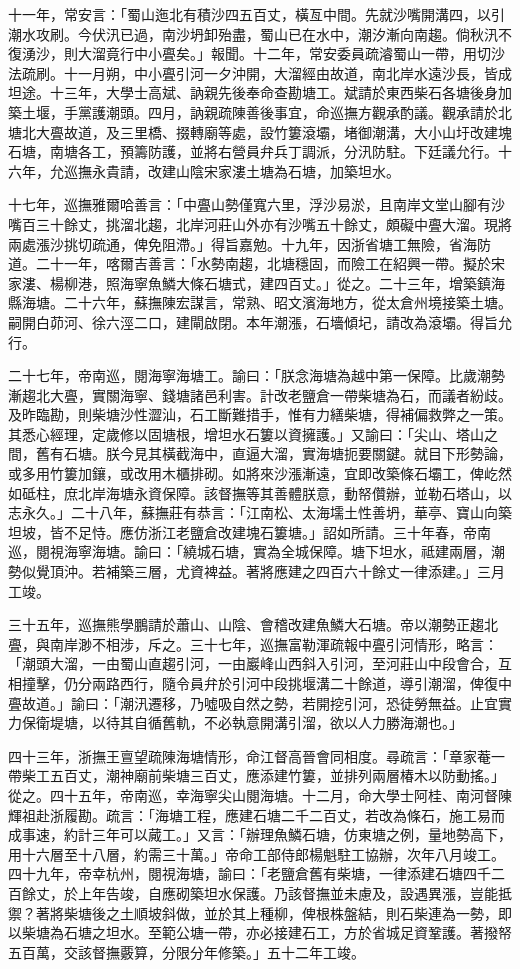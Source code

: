 \begin{pinyinscope}
十一年，常安言：「蜀山迤北有積沙四五百丈，橫亙中間。先就沙嘴開溝四，以引潮水攻刷。今伏汛已過，南沙坍卸殆盡，蜀山已在水中，潮汐漸向南趨。倘秋汛不復湧沙，則大溜竟行中小亹矣。」報聞。十二年，常安委員疏濬蜀山一帶，用切沙法疏刷。十一月朔，中小亹引河一夕沖開，大溜經由故道，南北岸水遠沙長，皆成坦途。十三年，大學士高斌、訥親先後奉命查勘塘工。斌請於東西柴石各塘後身加築土堰，手黨護潮頭。四月，訥親疏陳善後事宜，命巡撫方觀承酌議。觀承請於北塘北大亹故道，及三里橋、掇轉廟等處，設竹簍滾壩，堵御潮溝，大小山圩改建塊石塘，南塘各工，預籌防護，並將右營員弁兵丁調派，分汛防駐。下廷議允行。十六年，允巡撫永貴請，改建山陰宋家漊土塘為石塘，加築坦水。

十七年，巡撫雅爾哈善言：「中亹山勢僅寬六里，浮沙易淤，且南岸文堂山腳有沙嘴百三十餘丈，挑溜北趨，北岸河莊山外亦有沙嘴五十餘丈，頗礙中亹大溜。現將兩處漲沙挑切疏通，俾免阻滯。」得旨嘉勉。十九年，因浙省塘工無險，省海防道。二十一年，喀爾吉善言：「水勢南趨，北塘穩固，而險工在紹興一帶。擬於宋家漊、楊柳港，照海寧魚鱗大條石塘式，建四百丈。」從之。二十三年，增築鎮海縣海塘。二十六年，蘇撫陳宏謀言，常熟、昭文濱海地方，從太倉州境接築土塘。嗣開白茆河、徐六涇二口，建閘啟閉。本年潮漲，石墻傾圮，請改為滾壩。得旨允行。

二十七年，帝南巡，閱海寧海塘工。諭曰：「朕念海塘為越中第一保障。比歲潮勢漸趨北大亹，實關海寧、錢塘諸邑利害。計改老鹽倉一帶柴塘為石，而議者紛歧。及昨臨勘，則柴塘沙性澀汕，石工斷難措手，惟有力繕柴塘，得補偏救弊之一策。其悉心經理，定歲修以固塘根，增坦水石簍以資擁護。」又諭曰：「尖山、塔山之間，舊有石塘。朕今見其橫截海中，直逼大溜，實海塘扼要關鍵。就目下形勢論，或多用竹簍加鑲，或改用木櫃排砌。如將來沙漲漸遠，宜即改築條石壩工，俾屹然如砥柱，庶北岸海塘永資保障。該督撫等其善體朕意，動帑儹辦，並勒石塔山，以志永久。」二十八年，蘇撫莊有恭言：「江南松、太海壖土性善坍，華亭、寶山向築坦坡，皆不足恃。應仿浙江老鹽倉改建塊石簍塘。」詔如所請。三十年春，帝南巡，閱視海寧海塘。諭曰：「繞城石塘，實為全城保障。塘下坦水，祗建兩層，潮勢似覺頂沖。若補築三層，尤資裨益。著將應建之四百六十餘丈一律添建。」三月工竣。

三十五年，巡撫熊學鵬請於蕭山、山陰、會稽改建魚鱗大石塘。帝以潮勢正趨北亹，與南岸渺不相涉，斥之。三十七年，巡撫富勒渾疏報中亹引河情形，略言：「潮頭大溜，一由蜀山直趨引河，一由巖峰山西斜入引河，至河莊山中段會合，互相撞擊，仍分兩路西行，隨令員弁於引河中段挑堰溝二十餘道，導引潮溜，俾復中亹故道。」諭曰：「潮汛遷移，乃噓吸自然之勢，若開挖引河，恐徒勞無益。止宜實力保衛堤塘，以待其自循舊軌，不必執意開溝引溜，欲以人力勝海潮也。」

四十三年，浙撫王亶望疏陳海塘情形，命江督高晉會同相度。尋疏言：「章家菴一帶柴工五百丈，潮神廟前柴塘三百丈，應添建竹簍，並排列兩層椿木以防動搖。」從之。四十五年，帝南巡，幸海寧尖山閱海塘。十二月，命大學士阿桂、南河督陳輝祖赴浙履勘。疏言：「海塘工程，應建石塘二千二百丈，若改為條石，施工易而成事速，約計三年可以蕆工。」又言：「辦理魚鱗石塘，仿東塘之例，量地勢高下，用十六層至十八層，約需三十萬。」帝命工部侍郎楊魁駐工協辦，次年八月竣工。四十九年，帝幸杭州，閱視海塘，諭曰：「老鹽倉舊有柴塘，一律添建石塘四千二百餘丈，於上年告竣，自應砌築坦水保護。乃該督撫並未慮及，設遇異漲，豈能抵禦？著將柴塘後之土順坡斜做，並於其上種柳，俾根株盤結，則石柴連為一勢，即以柴塘為石塘之坦水。至範公塘一帶，亦必接建石工，方於省城足資鞏護。著撥帑五百萬，交該督撫覈算，分限分年修築。」五十二年工竣。


\end{pinyinscope}
